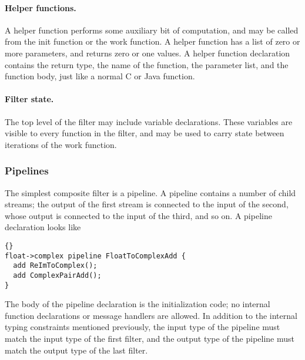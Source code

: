 \documentclass[11pt]{article}
\begin{document}
\paragraph{Helper functions.}  A helper function performs some
auxiliary bit of computation, and may be called from the init function
or the work function.  A helper function has a list of zero or more
parameters, and returns zero or one values.  A helper function
declaration contains the return type, the name of the function, the
parameter list, and the function body, just like a normal C or Java
function.

\paragraph{Filter state.}  The top level of the filter may include
variable declarations.  These variables are visible to every function
in the filter, and may be used to carry state between iterations of
the work function.


\subsubsection{Pipelines}

The simplest composite filter is a pipeline.  A pipeline contains a
number of child streams; the output of the first stream is connected
to the input of the second, whose output is connected to the input of
the third, and so on.  A pipeline declaration looks like

\begin{lstlisting}{}
float->complex pipeline FloatToComplexAdd {
  add ReImToComplex();
  add ComplexPairAdd();
}
\end{lstlisting}

The body of the pipeline declaration is the initialization code; no
internal function declarations or message handlers are allowed.  In
addition to the internal typing constraints mentioned previously, the
input type of the pipeline must match the input type of the first
filter, and the output type of the pipeline must match the output type
of the last filter.
\end{document}
